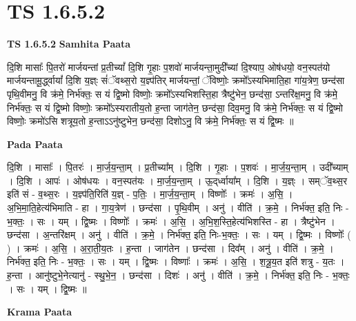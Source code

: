 \documentclass[17pt]{extarticle}
\begin{document}
\section*{ TS 1.6.5.2 }

\textbf{TS 1.6.5.2 } \newline
\textbf{Samhita Paata} \newline

दि॒शि मासाः᳚ पि॒तरो॑ मार्जयन्तां प्र॒तीच्यां᳚ दि॒शि गृ॒हाः प॒शवो॑ मार्जयन्ता॒मुदी᳚च्यां दि॒श्याप॒ ओष॑धयो॒ वन॒स्पत॑यो मार्जयन्तामू॒र्द्ध्वायां᳚ दि॒शि य॒ज्ञ्ः सं॑ॅवथ्स॒रो य॒ज्ञ्प॑तिर् मार्जयन्तां॒ ॅविष्णोः॒ क्रमो᳚ऽस्यभिमाति॒हा गा॑य॒त्रेण॒ छन्द॑सा पृथि॒वीमनु॒ वि क्र॑मे॒ निर्भ॑क्तः॒ स यं द्वि॒ष्मो विष्णोः॒ क्रमो᳚ऽस्यभिशस्ति॒हा त्रैष्टु॑भेन॒ छन्द॑सा॒ ऽन्तरि॑क्ष॒मनु॒ वि क्र॑मे॒ निर्भ॑क्तः॒ स यं द्वि॒ष्मो विष्णोः॒ क्रमो᳚ऽस्यरातीय॒तो ह॒न्ता जाग॑तेन॒ छन्द॑सा॒ दिव॒मनु॒ वि क्र॑मे॒ निर्भ॑क्तः॒ स यं द्वि॒ष्मो विष्णोः॒ क्रमो॑ऽसि शत्रूय॒तो ह॒न्ताऽऽनु॑ष्टुभेन॒ छन्द॑सा॒ दिशोऽनु॒ वि क्र॑मे॒ निर्भ॑क्तः॒ स यं द्वि॒ष्मः ॥ \newline

\textbf{Pada Paata} \newline

दि॒शि । मासाः᳚ । पि॒तरः॑ । मा॒र्ज॒य॒न्ता॒म् । प्र॒तीच्या᳚म् । दि॒शि । गृ॒हाः । प॒शवः॑ । मा॒र्ज॒य॒न्ता॒म् । उदी᳚च्याम् । दि॒शि । आपः॑ । ओष॑धयः । वन॒स्पत॑यः । मा॒र्ज॒य॒न्ता॒म् । ऊ॒द्‌र्ध्वाया᳚म् । दि॒शि । य॒ज्ञ्ः । सम्ॅव॒थ्स॒र इति॑ सं - व॒थ्स॒रः । य॒ज्ञ्प॑ति॒रिति॑ य॒ज्ञ् - प॒तिः॒ । मा॒र्ज॒य॒न्ता॒म् । विष्णोः᳚ । क्रमः॑ । अ॒सि॒ । अ॒भि॒मा॒ति॒हेत्य॑भिमाति - हा । गा॒य॒त्रेण॑ । छन्द॑सा । पृ॒थि॒वीम् । अनु॑ । वीति॑ । क्र॒मे॒ । निर्भ॑क्त॒ इति॒ निः - भ॒क्तः॒ । सः । यम् । द्वि॒ष्मः । विष्णोः᳚ । क्रमः॑ । अ॒सि॒ । अ॒भि॒श॒स्ति॒हेत्य॑भिशस्ति - हा । त्रैष्टु॑भेन । छन्द॑सा । अ॒न्तरि॑क्षम् । अनु॑ । वीति॑ । क्र॒मे॒ । निर्भ॑क्त॒ इति॒ निः-भ॒क्तः॒ । सः । यम् । द्वि॒ष्मः । विष्णोः᳚ ( ) । क्रमः॑ । अ॒सि॒ । अ॒रा॒ती॒य॒तः । ह॒न्ता । जाग॑तेन । छन्द॑सा । दिव᳚म् । अनु॑ । वीति॑ । क्र॒मे॒ । निर्भ॑क्त॒ इति॒ निः - भ॒क्तः॒ । सः । यम् । द्वि॒ष्मः । विष्णाः᳚ । क्रमः॑ । अ॒सि॒ । श॒त्रू॒य॒त इति॑ शत्रु - य॒तः । ह॒न्ता । आनु॑ष्टुभे॒नेत्यानु॑ - स्थु॒भे॒न॒ । छन्द॑सा । दिशः॑ । अनु॑ । वीति॑ । क्र॒मे॒ । निर्भ॑क्त॒ इति॒ निः - भ॒क्तः॒ । सः । यम् । द्वि॒ष्मः ॥  \newline


\textbf{Krama Paata} \newline
\end{document}
